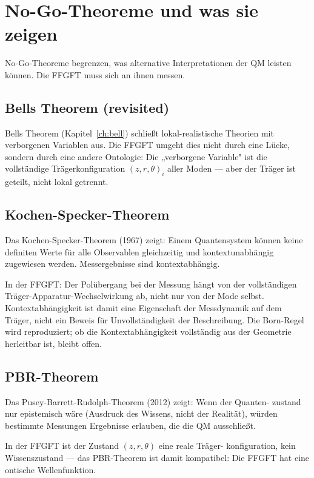 \chapter{No-Go-Theoreme und was sie zeigen}
\label{ch:nogo}

No-Go-Theoreme begrenzen, was alternative Interpretationen der QM
leisten können. Die FFGFT muss sich an ihnen messen.

\section{Bells Theorem (revisited)}

Bells Theorem (Kapitel~\ref{ch:bell}) schließt lokal-realistische
Theorien mit verborgenen Variablen aus. Die FFGFT umgeht dies
nicht durch eine Lücke, sondern durch eine andere Ontologie: Die
„verborgene Variable" ist die vollständige Trägerkonfiguration
$(z,r,\theta)_i$ aller Moden — aber der Träger ist geteilt, nicht
lokal getrennt.

\section{Kochen-Specker-Theorem}

Das Kochen-Specker-Theorem (1967) zeigt: Einem Quantensystem können
keine definiten Werte für alle Observablen gleichzeitig und
kontextunabhängig zugewiesen werden. Messergebnisse sind
kontextabhängig.

In der FFGFT: Der Polübergang bei der Messung hängt von der
vollständigen Träger-Apparatur-Wechselwirkung ab, nicht nur von
der Mode selbst. Kontextabhängigkeit ist damit eine Eigenschaft
der Messdynamik auf dem Träger, nicht ein Beweis für Unvollständigkeit
der Beschreibung. Die Born-Regel wird reproduziert;
ob die Kontextabhängigkeit vollständig aus der Geometrie herleitbar
ist, bleibt offen.

\section{PBR-Theorem}

Das Pusey-Barrett-Rudolph-Theorem (2012) zeigt: Wenn der Quanten-
zustand nur epistemisch wäre (Ausdruck des Wissens, nicht der
Realität), würden bestimmte Messungen Ergebnisse erlauben, die die
QM ausschließt.

In der FFGFT ist der Zustand $(z,r,\theta)$ eine reale Träger-
konfiguration, kein Wissenszustand — das PBR-Theorem ist damit
kompatibel: Die FFGFT hat eine ontische Wellenfunktion.

